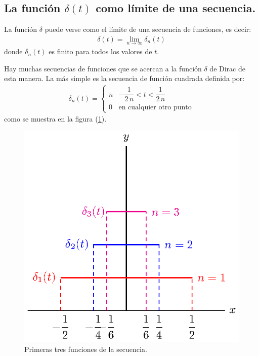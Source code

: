 \subsection{La función \texorpdfstring{$\delta(t)$}{d(t)} como límite de una secuencia.}\label{secuencias_delta}

La función $\delta$ puede verse como el límite de una secuencia de funciones, es decir:
\begin{align}
\delta(t) = \lim_{n \to \infty} \delta_{n} (t)
\label{eq:ecuacion_05_10}
\end{align}
donde $\delta_{n}(t)$ es finito para todos los valores de $t$.
\par
Hay muchas secuencias de funciones que se acercan a la función $\delta$ de Dirac de esta manera. La más simple es la secuencia de función cuadrada definida por:
\begin{align}
\delta_{n} (t) = \begin{cases}
n & -\dfrac{1}{2 \, n} < t < \dfrac{1}{2 \, n} \\
0 & \mbox{en cualquier otro punto}
\end{cases}
\label{eq:ecuacion_05_11}
\end{align}
como se muestra en la figura (\ref{fig:figura_05_06}).
\begin{figure}[H]
    \centering
    \includegraphics[scale=1.3]{Imagenes/plot_secuencia_delta_02.eps}
    \caption{Primeras tres funciones de la secuencia.}
    \label{fig:figura_05_06}
\end{figure}
